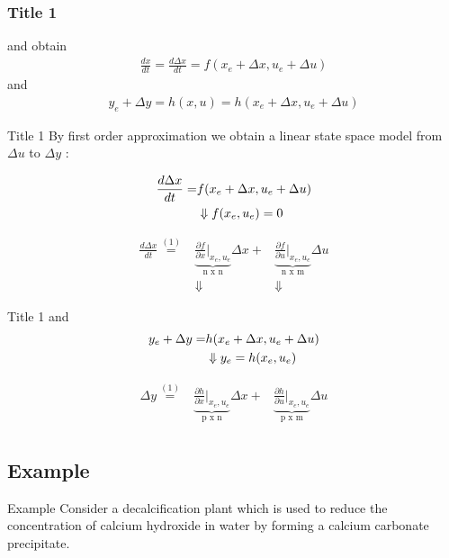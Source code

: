 \begin{frame}
\frametitle{Title 1}
and obtain
\begin{align*}
\frac{dx}{dt} = \frac{d\Delta x}{dt} = f(x_e+\Delta x,u_e+\Delta u)
\end{align*}
and
\begin{align*}
y_e + \Delta y = h(x,u) = h(x_e+\Delta x,u_e+\Delta u)
\end{align*}
\end{frame}

\begin{frame}{Title 1}
By first order approximation we obtain a linear state space
model from $\Delta u$ to $\Delta y$ :

\begin{align*}
\frac{d\Delta x}{dt}=&f(x_e+\Delta x,u_e+\Delta u)\\
&\Downarrow {\tiny {f(x_e,u_e)=0}} %
\end{align*}

\begin{align*}
\frac{d\Delta x}{dt}\stackrel{(1)}{=}&\underbrace{\frac{\partial f}{\partial x}\bigg|_{x_e,u_e}}_\text{n x n}
\Delta x + &\underbrace{\frac{\partial f}{\partial u}\bigg|_{x_e,u_e}}_\text{n x m}
\Delta u\\
&\Downarrow &\Downarrow
\end{align*}


\end{frame}

\begin{frame}{Title 1}
and
\begin{align*}
y_e+ \Delta y=&h(x_e+\Delta x,u_e+\Delta u)\\
&\Downarrow {\tiny y_e=h(x_e,u_e)}
\end{align*}

\begin{align*}
\Delta y\stackrel{(1)}{=}&\underbrace{\frac{\partial h}{\partial x}\bigg|_{x_e,u_e} }_\text{p x n}
\Delta x + &\underbrace{\frac{\partial h}{\partial u}\bigg|_{x_e,u_e}}_\text{p x m}
\Delta u\\
\end{align*}
\end{frame}



\subsection{Example}
\begin{frame}{Example}
Consider a decalcification plant which is used to reduce the
concentration of calcium hydroxide in water by forming a
calcium carbonate precipitate.

\end{frame}

